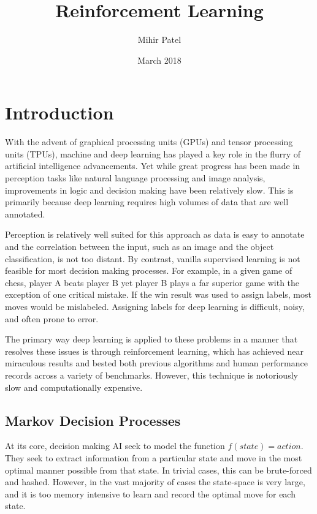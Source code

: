 \documentclass{article}
\title{Reinforcement Learning}
\author{Mihir Patel}
\date{March 2018}
\begin{document}
\maketitle

\section{Introduction}
\label{submission}

With the advent of graphical processing units (GPUs) and tensor processing units (TPUs), machine and deep learning has played a key role in the flurry of artificial intelligence advancements. Yet while great progress has been made in perception tasks like natural language processing and image analysis, improvements in logic and decision making have been relatively slow. This is primarily because deep learning requires high volumes of data that are well annotated.

Perception is relatively well suited for this approach as data is easy to annotate and the correlation between the input, such as an image and the object classification, is not too distant. By contrast, vanilla supervised learning is not feasible for most decision making processes. For example, in a given game of chess, player A beats player B yet player B plays a far superior game with the exception of one critical mistake. If the win result was used to assign labels, most moves would be mislabeled. Assigning labels for deep learning is difficult, noisy, and often prone to error.

The primary way deep learning is applied to these problems in a manner that resolves these issues is through reinforcement learning, which has achieved near miraculous results and bested both previous algorithms and human performance records across a variety of benchmarks. However, this technique is notoriously slow and computationally expensive.

\subsection{Markov Decision Processes}

At its core, decision making AI seek to model the function $f(state) = action$. They seek to extract information from a particular state and move in the most optimal manner possible from that state. In trivial cases, this can be brute-forced and hashed. However, in the vast majority of cases the state-space is very large, and it is too memory intensive to learn and record the optimal move for each state.
\end{document}
